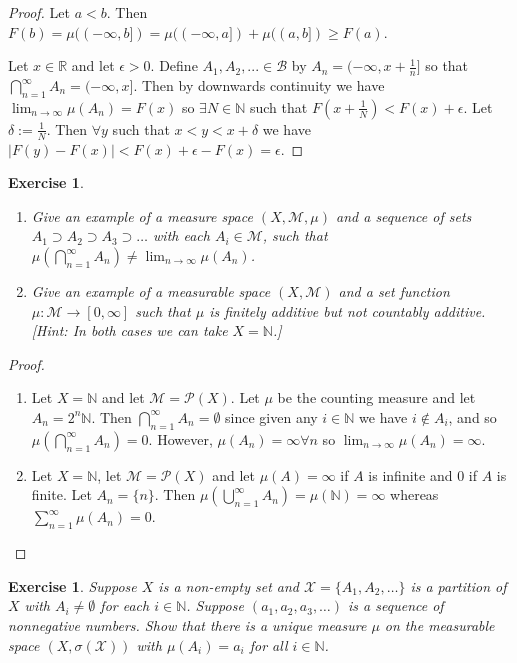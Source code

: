 \documentclass{article}
\newtheorem{exercise}[theorem]{Exercise}
\begin{document}
\begin{proof}
Let $a<b$. Then $F(b)=\mu((-\infty,b])=\mu((-\infty,a])+\mu((a,b])\geq F(a)$.

Let $x\in\mathbb{R}$ and let $\epsilon>0$.
Define $A_1,A_2,...\in\mathcal{B}$ by $A_n=(-\infty,x+\frac{1}{n}]$ so that $\bigcap_{n=1}^\infty A_n=(-\infty,x]$. Then by downwards continuity we have $\lim_{n\to\infty}\mu(A_n)=F(x)$ so $\exists N\in\mathbb{N}$ such that $F(x+\frac{1}{N})<F(x)+\epsilon$. Let $\delta:=\frac{1}{N}$. Then $\forall y$ such that $x<y<x+\delta$ we have $|F(y)-F(x)|<F(x)+\epsilon-F(x)=\epsilon$.
\end{proof}
\begin{exercise}
    \begin{enumerate}
        \item Give an example of a measure space $(X, \mathcal{M}, \mu)$ and a sequence of sets $A_1 \supset A_2 \supset A_3 \supset \ldots$ with each $A_i \in \mathcal{M}$, such that $\mu(\bigcap_{n=1}^{\infty} A_n) \neq \lim_{n \to \infty} \mu(A_n)$.
        \item Give an example of a measurable space $(X, \mathcal{M})$ and a set function $\mu : \mathcal{M} \to [0, \infty]$ such that $\mu$ is finitely additive but not countably additive. 
        [\textit{Hint: In both cases we can take $X = \mathbb{N}$.}]
    \end{enumerate}
\end{exercise}
\begin{proof}
\begin{enumerate}
    \item Let $X=\mathbb{N}$ and let $\mathcal{M}=\mathcal{P}(X)$. Let $\mu$ be the counting measure and let $A_n=2^n\mathbb{N}$. Then $\bigcap_{n=1}^\infty A_n=\emptyset$ since given any $i\in\mathbb{N}$ we have $i\not\in A_{i}$, and so $\mu(\bigcap_{n=1}^\infty A_n)=0$. However, $\mu(A_n)=\infty\forall n$ so $\lim_{n\to\infty}\mu(A_n)=\infty$.
    \item Let $X=\mathbb{N}$, let $\mathcal{M}=\mathcal{P}(X)$ and let $\mu(A)=\infty$ if $A$ is infinite and $0$ if $A$ is finite. Let $A_n=\{n\}$. Then $\mu(\bigcup_{n=1}^\infty A_n)=\mu(\mathbb{N})=\infty$ whereas $\sum_{n=1}^\infty\mu(A_n)=0$.
\end{enumerate}
\end{proof}
\begin{exercise}
    Suppose $X$ is a non-empty set and $\mathcal{X} = \{A_1, A_2, \ldots\}$ is a partition of $X$ with $A_i \neq \emptyset$ for each $i \in \mathbb{N}$. Suppose $(a_1, a_2, a_3, \ldots)$ is a sequence of nonnegative numbers. Show that there is a unique measure $\mu$ on the measurable space $(X, \sigma(\mathcal{X}))$ with $\mu(A_i) = a_i$ for all $i \in \mathbb{N}$.
\end{exercise}
\end{document}

